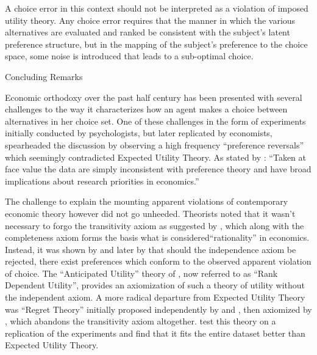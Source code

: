 \documentclass[../main.tex]{subfiles}
\begin{document}
A choice error in this context should not be interpreted as a violation of imposed utility theory.
Any choice error requires that the manner in which the various alternatives are evaluated and ranked be consistent with the subject's latent preference structure, but in the mapping of the subject's preference to the choice space, some noise is introduced that leads to a sub-optimal choice.

Concluding Remarks

Economic orthodoxy over the past half century has been presented with several challenges to the way it characterizes how an agent makes a choice between alternatives in her choice set.
One of these challenges in the form of experiments initially conducted by psychologists, but later replicated by economists, spearheaded the discussion by observing a high frequency \enquote{preference reversals} which seemingly contradicted Expected Utility Theory.
As stated by \textcite{Grether1979}: \enquote{Taken at face value the data are simply inconsistent with preference theory and have broad implications about research priorities in economics.}

The challenge to explain the mounting apparent violations of contemporary economic theory however did not go unheeded.
Theorists noted that it wasn't necessary to forgo the transitivity axiom as suggested by \textcite[623]{Grether1979}, which along with the completeness axiom forms the basis what is considered\enquote{rationality} in economics.
Instead, it was shown by \textcite{Holt1986} and later by \textcite{Karni1987} that should the independence axiom be rejected, there exist preferences which conform to the observed apparent violation of choice.
The \enquote{Anticipated Utility} theory of \textcite{Quiggin1982}, now referred to as \enquote{Rank Dependent Utility}, provides an axiomization of such a theory of utility without the independent axiom.
A more radical departure from Expected Utility Theory was \enquote{Regret  Theory} initially proposed independently by \textcite{Bell1982} and \textcite{Loomes1982}, then axiomized by \textcite{Fishburn1987}, which abandons the transitivity axiom altogether.
\textcite{Loomes1989} test this theory on a replication of the \textcite{Grether1979} experiments and find that it fits the entire dataset better than Expected Utility Theory.
\end{document}
